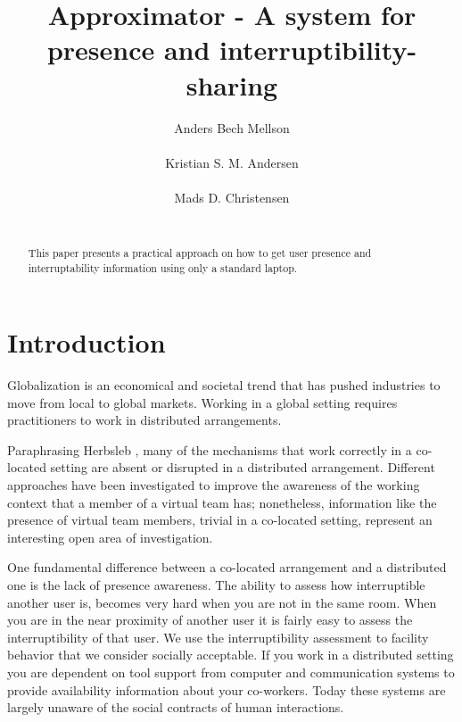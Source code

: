 \documentclass{sigchi}
\begin{document}
\title{Approximator - A system for presence and interruptibility-sharing}
\author{
  \alignauthor Anders Bech Mellson\\
    \\
  \alignauthor Kristian S. M. Andersen\\
    \\
  \alignauthor Mads D. Christensen\\
    \\
}

\maketitle

\begin{abstract}
This paper presents a practical approach on how to get user presence and interruptability information using only a standard laptop.
\end{abstract}



\section{Introduction}
Globalization is an economical and societal trend that has pushed industries to move from local to global markets.
Working in a global setting requires practitioners to work in distributed arrangements.

Paraphrasing Herbsleb \cite{herbsleb2007}, many of the mechanisms that work correctly in a co-located setting are absent or disrupted in a distributed arrangement.
Different approaches \cite{bly1993media} \cite{fogarty2004myvine} \cite{hincapie2011design} \cite{lai2003myteam} \cite{want1992active} have been investigated to improve the awareness of the working context that a member of a virtual team has; nonetheless, information like the presence of virtual team members, trivial in a co-located setting, represent an interesting open area of investigation.

One fundamental difference between a co-located arrangement and a distributed one is the lack of presence awareness.
The ability to assess how interruptible another user is, becomes very hard when you are not in the same room.
When you are in the near proximity of another user it is fairly easy to assess the interruptibility of that user.
We use the interruptibility assessment to facility behavior that we consider socially acceptable.
If you work in a distributed setting you are dependent on tool support from computer and communication systems to provide availability information about your co-workers.
Today these systems are largely unaware of the social contracts of human interactions.
\end{document}
